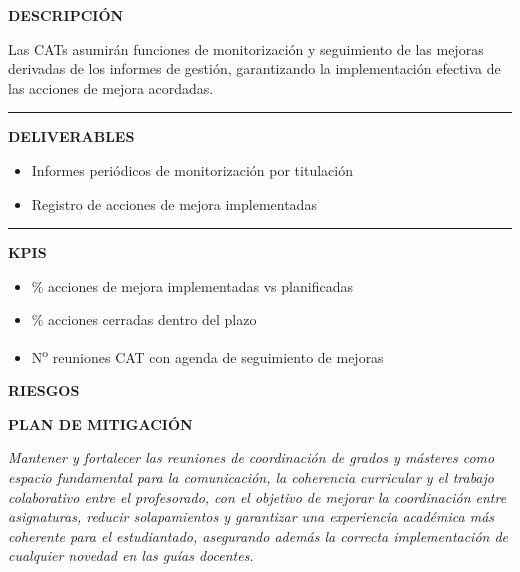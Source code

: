 \documentclass[11pt,a4paper]{scrreprt}
\newcommand{\fieldlabel}[1]{%
  {\footnotesize\sffamily\bfseries\color{mutedcolor}\MakeUppercase{#1}}\par\nopagebreak[4]
}
\newcommand{\fieldsep}{\vspace{3pt}\noindent\textcolor{bordercolor}{\rule{\linewidth}{0.4pt}}\vspace{3pt}\par}
\begin{document}
\begin{tcolorbox}[pabox={gobcolor}{PA2.2 \enspace\textbullet\enspace Seguimiento y monitorización de mejoras por las CATs}]

\fieldlabel{Descripci\'on}
{\small Las CATs asumirán funciones de monitorización y seguimiento de las mejoras derivadas de los informes de gestión, garantizando la implementación efectiva de las acciones de mejora acordadas.}\par
\fieldsep
\fieldlabel{Deliverables}
{\small \begin{itemize}[noitemsep,topsep=2pt]
\item Informes periódicos de monitorización por titulación
\item Registro de acciones de mejora implementadas
\end{itemize}}\par
\fieldsep
\fieldlabel{KPIs}
{\small \begin{itemize}[noitemsep,topsep=2pt]
\item \% acciones de mejora implementadas vs planificadas
\item \% acciones cerradas dentro del plazo
\item N\textsuperscript{o} reuniones CAT con agenda de seguimiento de mejoras
\end{itemize}}\par
\end{tcolorbox}
\begin{tcolorbox}[riskbox]
{\footnotesize\sffamily\bfseries\color{red!50!black} RIESGOS}\par{}
\end{tcolorbox}
\begin{tcolorbox}[mitbox]
{\footnotesize\sffamily\bfseries\color{green!40!black} PLAN DE MITIGACI\'ON}\par{}
\end{tcolorbox}
\vspace{8pt}

\newpage
{}
{\small\color{mutedcolor}\itshape Mantener y fortalecer las reuniones de coordinación de grados y másteres como espacio fundamental para la comunicación, la coherencia curricular y el trabajo colaborativo entre el profesorado, con el objetivo de mejorar la coordinación entre asignaturas, reducir solapamientos y garantizar una experiencia académica más coherente para el estudiantado, asegurando además la correcta implementación de cualquier novedad en las guías docentes.}\par\vspace{6pt}
\end{document}
